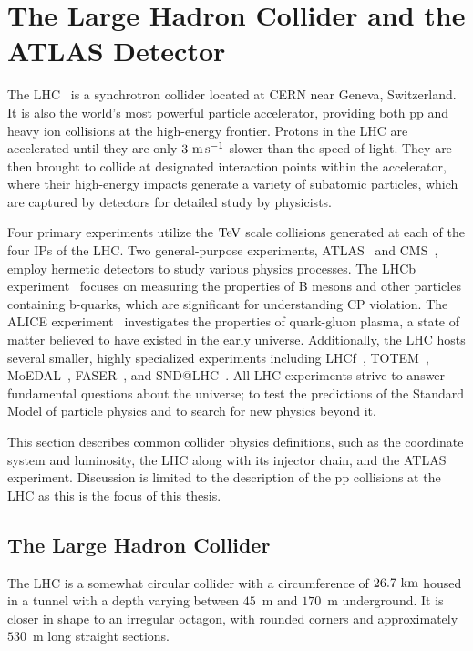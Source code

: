
\chapter{The Large Hadron Collider and the ATLAS Detector}
\label{ch:lhc_atlas_detector}

The \Gls{LHC}~\cite{LHCMachine,LHC1,LHC2,LHC3} is a synchrotron collider located at \Gls{CERN} near Geneva, Switzerland.
It is also the world's most powerful particle accelerator, providing both \Gls{pp} and heavy ion collisions at the high-energy frontier.
Protons in the \Gls{LHC} are accelerated until they are only $3~\mps$ slower than the speed of light.
They are then brought to collide at designated interaction points within the accelerator, where their high-energy impacts generate a variety of subatomic particles, which are captured by detectors for detailed study by physicists.

Four primary experiments utilize the $\TeV$ scale collisions generated at each of the four \Gls{IPs} of the \Gls{LHC}.
Two general-purpose experiments, ATLAS~\cite{ATLAS} and CMS~\cite{CMS}, employ hermetic detectors to study various physics processes.
The \Gls{LHCb} experiment~\cite{LHCb} focuses on measuring the properties of B mesons and other particles containing b-quarks, which are significant for understanding CP violation.
The \Gls{ALICE} experiment~\cite{ALICE} investigates the properties of quark-gluon plasma, a state of matter believed to have existed in the early universe.
Additionally, the \Gls{LHC} hosts several smaller, highly specialized experiments including LHCf~\cite{LHCf}, TOTEM~\cite{TOTEM}, MoEDAL~\cite{MoEDAL}, FASER~\cite{FASER}, and SND@LHC~\cite{SNDLHC}.
All \Gls{LHC} experiments strive to answer fundamental questions about the universe; to test the predictions of the Standard Model of particle physics and to search for new physics beyond it.

This section describes common collider physics definitions, such as the coordinate system and luminosity,
the \Gls{LHC} along with its injector chain, and the ATLAS experiment.
Discussion is limited to the description of the \Gls{pp} collisions at the \Gls{LHC} as this is the focus of this thesis.

\section{The Large Hadron Collider}

The \Gls{LHC} is a somewhat circular collider with a circumference of $26.7~\km$ housed in a tunnel with a depth varying between $45$~m and $170$~m underground.
It is closer in shape to an irregular octagon, with rounded corners and approximately $530$~m long straight sections.


